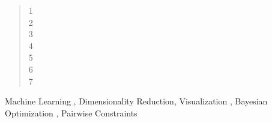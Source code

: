 \begin{abstract}
  1 \\ 2\\ 3\\ 4\\ 5 \\ 6 \\ 7\\
\end{abstract}



\begin{keywords}
  Machine Learning \sep
  Dimensionality Reduction\sep
  Visualization \sep
  Bayesian Optimization \sep
  Pairwise Constraints
\end{keywords}
